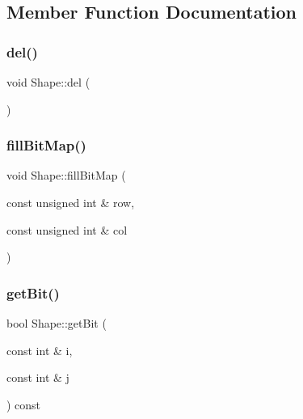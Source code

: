 \subsection{Member Function Documentation}
\mbox{\label{class_shape_a7f336c18e4bbd3035542037862d0eec7}} 
\subsubsection{\texorpdfstring{del()}{del()}}
{\footnotesize\ttfamily void Shape\+::del (\begin{DoxyParamCaption}{ }\end{DoxyParamCaption})\hspace{0.3cm}{\ttfamily [virtual]}}

\mbox{\label{class_shape_a285a0848e8bc19b0e76e2661d63bb1a1}} 
\subsubsection{\texorpdfstring{fill\+Bit\+Map()}{fillBitMap()}}
{\footnotesize\ttfamily void Shape\+::fill\+Bit\+Map (\begin{DoxyParamCaption}\item[{const unsigned int \&}]{row,  }\item[{const unsigned int \&}]{col }\end{DoxyParamCaption})\hspace{0.3cm}{\ttfamily [virtual]}}

\mbox{\label{class_shape_ab486d732a49d49cbbc4fadf1f23c379e}} 
\subsubsection{\texorpdfstring{get\+Bit()}{getBit()}}
{\footnotesize\ttfamily bool Shape\+::get\+Bit (\begin{DoxyParamCaption}\item[{const int \&}]{i,  }\item[{const int \&}]{j }\end{DoxyParamCaption}) const\hspace{0.3cm}{\ttfamily [virtual]}}



